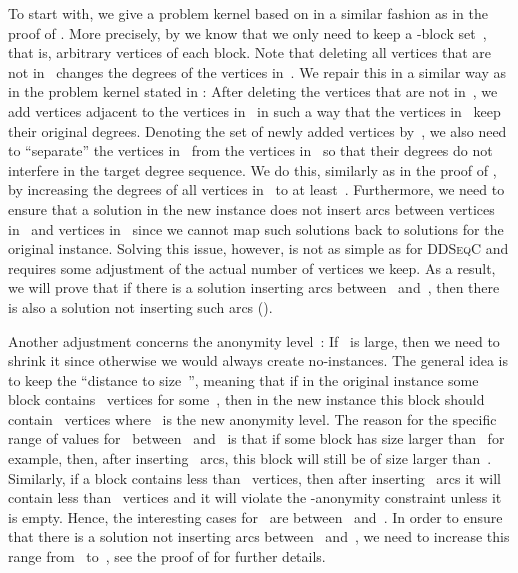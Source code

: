 \documentclass[a4paper,11pt]{article}
\theoremstyle{remark}
\theoremstyle{plain}
\theoremstyle{definition}
\newcommand{\DDSC}{\textsc{DDSeqC}\xspace}
\begin{document}
To start with, we give a problem kernel based on  in a similar fashion as in the proof of .
More precisely, by  we know that we only need to keep a -block set~, that is,  arbitrary vertices of each block.
Note that deleting all vertices that are not in~ changes the degrees of the vertices in~.
We repair this in a similar way as in the problem kernel stated in : 
After deleting the vertices that are not in~, we add vertices adjacent to the vertices in~ in such a way that the vertices in~ keep their original degrees. 
Denoting the set of newly added vertices by~, we also need to ``separate'' the vertices in~ from the vertices in~ so that their degrees do not interfere in the target degree sequence. 
We do this, similarly as in the proof of , by increasing the degrees of all vertices in~ to at least~. 
Furthermore, we need to ensure that a solution in the new instance does not insert arcs between vertices in~ and vertices in~ since we cannot map such solutions back to solutions for the original instance.
Solving this issue, however, is not as simple as for \DDSC
and requires some adjustment of the actual number of vertices we keep. 
As a result, we will prove that if there is a solution inserting arcs between~ and~, then there is also a solution not inserting such arcs ().

Another adjustment concerns the anonymity level~: 
If~ is large, then we need to shrink it since otherwise we would always create no-instances. 
The general idea is to keep the ``distance to size~'', meaning that if in the original instance some block contains~ vertices for some~, then in the new instance this block should contain~ vertices where~ is the new anonymity level.
The reason for the specific range of values for~ between~ and~ is that if some block has size larger than~ for example, then, after inserting~ arcs, this block will still be of size larger than~.
Similarly, if a block contains less than~ vertices, then after inserting~ arcs it will contain less than~ vertices and it will violate the -anonymity constraint unless it is empty. 
Hence, the interesting cases for~ are between~ and~.
In order to ensure that there is a solution not inserting arcs between~ and~, we need to increase this range from~ to~, see the proof of  for further details.
\end{document}
